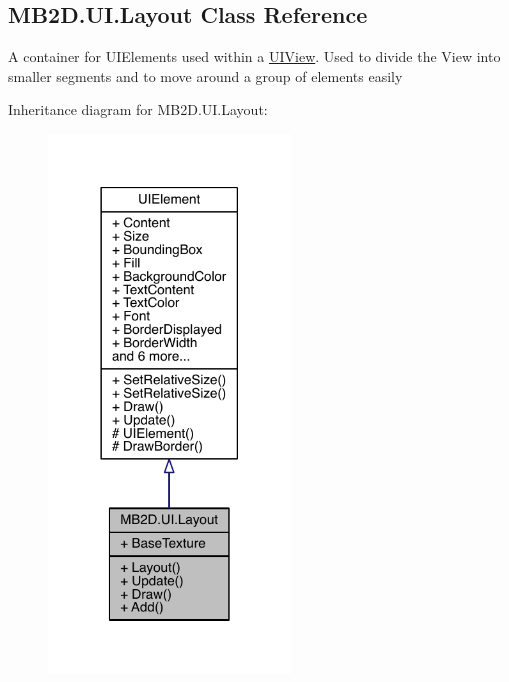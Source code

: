 \hypertarget{class_m_b2_d_1_1_u_i_1_1_layout}{}\subsection{M\+B2\+D.\+U\+I.\+Layout Class Reference}
\label{class_m_b2_d_1_1_u_i_1_1_layout}


A container for U\+I\+Elements used within a \hyperlink{class_m_b2_d_1_1_u_i_1_1_u_i_view}{U\+I\+View}. Used to divide the View into smaller segments and to move around a group of elements easily  




Inheritance diagram for M\+B2\+D.\+U\+I.\+Layout\+:
\nopagebreak
\begin{figure}[H]
\begin{center}
\leavevmode
\includegraphics[width=182pt]{class_m_b2_d_1_1_u_i_1_1_layout__inherit__graph}
\end{center}
\end{figure}


